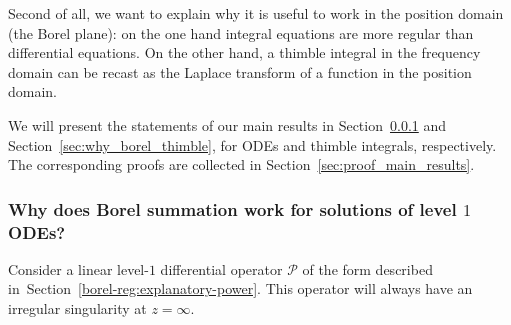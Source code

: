 \documentclass{article}
\theoremstyle{definition}
\theoremstyle{plain}
\begin{document}
Second of all, we want to explain why it is useful to work in the position domain (the Borel plane): on the one hand integral equations are more regular than differential equations. On the other hand, a thimble integral in the frequency domain can be recast as the Laplace transform of a function in the position domain.

We will present the statements of our main results in Section~\ref{sec:why_borel_ODE} and Section~\ref{sec:why_borel_thimble}, for ODEs and thimble integrals, respectively. The corresponding proofs are collected in Section~\ref{sec:proof_main_results}.
\subsubsection{Why does Borel summation work for solutions of level $1$ ODEs?}\label{sec:why_borel_ODE}
%
Consider a linear level-$1$ differential operator $\mathcal{P}$ of the form described in~Section~\ref{borel-reg:explanatory-power}. This operator will always have an irregular singularity at $z = \infty$.
\end{document}
